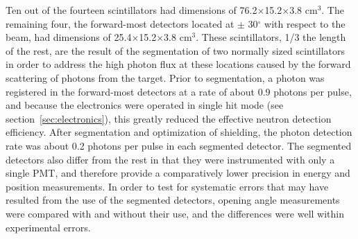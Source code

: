 Ten out of the fourteen scintillators had dimensions of 76.2$\times$15.2$\times$3.8 cm$^3$.
The remaining four, the forward-most detectors located at $\pm$ 30$^{\circ}$ with respect to the beam, had dimensions of 25.4$\times$15.2$\times$3.8 cm$^3$.
These scintillators, 1/3 the length of the rest, are the result of the segmentation of two normally sized scintillators in order to address the high photon flux at these locations caused by the forward scattering of photons from the target.
Prior to segmentation, a photon was registered in the forward-most detectors at a rate of about 0.9 photons per pulse, and because the electronics were operated in single hit mode (see section~\ref{sec:electronics}), this greatly reduced the effective neutron detection efficiency.
After segmentation and optimization of shielding, the photon detection rate was about 0.2 photons per pulse in each segmented detector.\onlyThesis
The segmented detectors also differ from the rest in that they were instrumented with only a single PMT, and therefore provide a comparatively lower precision in energy and position measurements.
In order to test for systematic errors that may have resulted from the use of the segmented detectors, opening angle measurements were compared with and without their use, and the differences were well within experimental errors.

